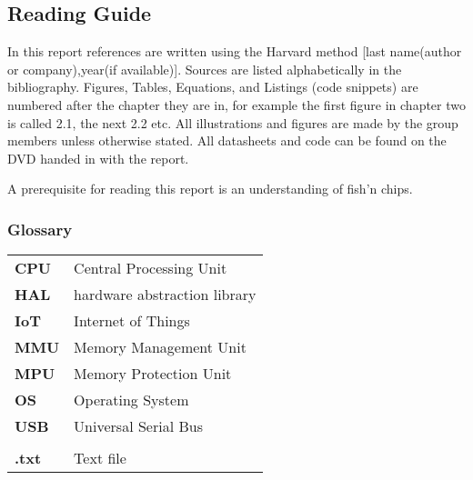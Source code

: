 \subsection*{Reading Guide}
\label{sub:reading_guide}

In this report references are written using the Harvard method [last name(author or company),year(if available)].
Sources are listed alphabetically in the bibliography.
Figures, Tables, Equations, and Listings (code snippets) are numbered after the chapter they are in,
for example the first figure in chapter two is called 2.1, the next 2.2 etc.
All illustrations and figures are made by the group members unless otherwise stated.
All datasheets and code can be found on the DVD handed in with the report.

A prerequisite for reading this report is an understanding of fish'n chips.

\subsubsection{Glossary}
\begin{longtable}{l p{12cm}}
\textbf{CPU}		& \qquad \qquad Central Processing Unit\\
\textbf{HAL}		& \qquad \qquad hardware abstraction library\\
\textbf{IoT}		& \qquad \qquad Internet of Things\\
\textbf{MMU}		& \qquad \qquad Memory Management Unit\\
\textbf{MPU}		& \qquad \qquad Memory Protection Unit\\
\textbf{OS}			& \qquad \qquad Operating System\\
\textbf{USB}		& \qquad \qquad Universal Serial Bus\\
					& \\
\textbf{.txt}		& \qquad \qquad Text file\\

\end{longtable}
